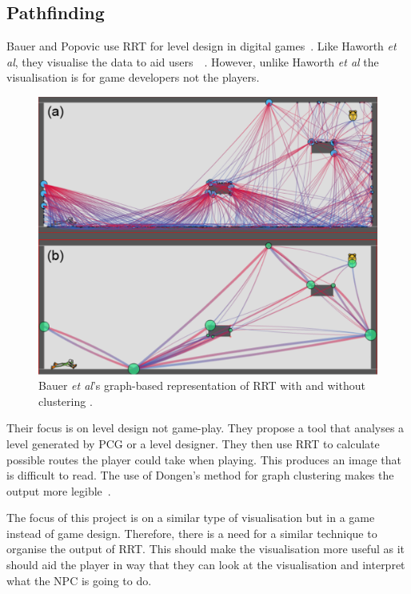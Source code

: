 \documentclass[journal]{IEEEtran}
\begin{document}
\subsection{Pathfinding}
Bauer and Popovic use RRT for level design in digital games~\cite{bauer2012}. Like Haworth \textit{et al}, they visualise the data to aid users~\cite{bauer2012}~\cite{Haworth2010}. However, unlike Haworth \textit{et al} the visualisation is for game developers not the players. 

\begin{figure}[h]
	\includegraphics[width=1.0\linewidth]{BauerRRT.png}
	\caption{ Bauer \textit{et al}'s graph-based representation of RRT with and without clustering \cite{bauer2012}.}
	\label{BauerRRT}
\end{figure} 

Their focus is on level design not game-play. They propose a tool that analyses a level generated by PCG or a level designer. They then use RRT to calculate possible routes the player could take when playing.  
This produces an image that is difficult to read. The use of Dongen's method for graph clustering makes the output more legible~\cite{bauer2012, van2001}.  

The focus of this project is on a similar type of  visualisation but in a game instead of game design. Therefore, there is a need for a similar technique to organise the output of RRT.  This should make the visualisation  more useful as it should aid the player in way that they can look at the visualisation and interpret what the NPC is going to do. 
\end{document}

